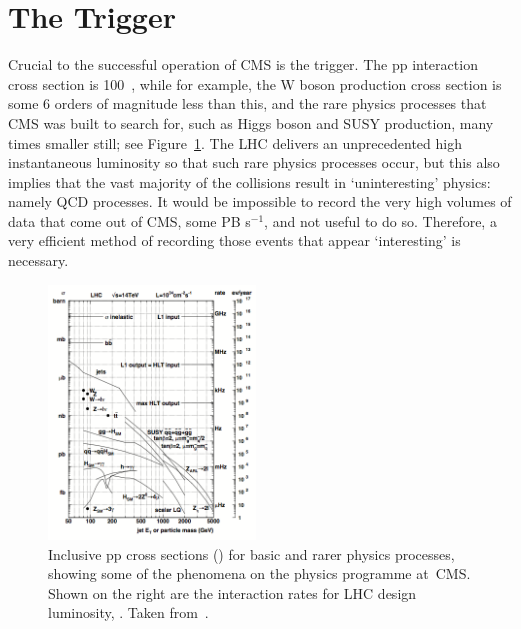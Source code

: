 

\newpage
\section{The Trigger} \label{sec:CMStrig}

Crucial to the successful operation of \ac{CMS} is the trigger. 
The pp interaction cross section is 100~\mb, while for example, the W boson production cross section is some 6 orders of magnitude less than this, and the rare physics processes that \ac{CMS} was built to search for, such as Higgs boson and \ac{SUSY} production, many times smaller still; see Figure~\ref{fig:ppCrossSec}.
The \ac{LHC} delivers an unprecedented high instantaneous luminosity so that such rare physics processes occur, but this also implies that the vast majority of the collisions result in `uninteresting' physics: namely \ac{QCD} processes.
It would be impossible to record the very high volumes of data that come out of \ac{CMS}, some PB s$^{-1}$, and not useful to do so.
Therefore, a very efficient method of recording those events that appear `interesting'
is necessary.%

\begin{figure}[htbp]
  \begin{center}
  \includegraphics[width=0.49\textwidth]{Figures/detector/ppCrossSections}
  \caption{Inclusive pp cross sections (\sigma) for basic and rarer physics processes, showing some of the phenomena on the physics programme at~\ac{CMS}. Shown on the right are the interaction rates for \ac{LHC} design luminosity, \designLumi. Taken from~\cite{Cittolin:578006}.
}
  \label{fig:ppCrossSec}
  \end{center}
\end{figure}


